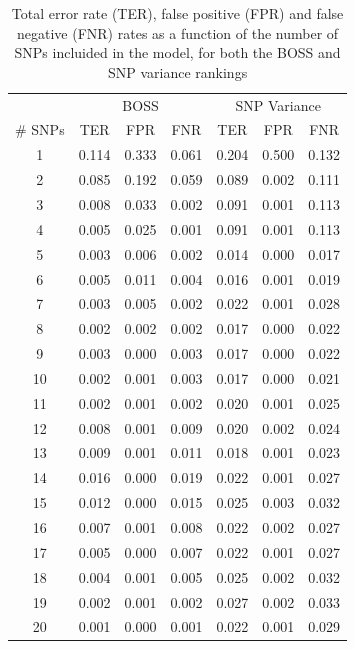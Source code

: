\begin{table}
\centering
\caption{Total error rate (TER), false positive (FPR) and false negative
  (FNR) rates as a function of the number of SNPs incluided in the
  model, for both the BOSS and SNP variance rankings}
\label{tab:error}       %
\begin{tabular}{ccccccc}
\hline\noalign{\smallskip}
 & \multicolumn{3}{c}{BOSS} & \multicolumn{3}{c}{SNP Variance}\\
\noalign{\smallskip}\hline\noalign{\smallskip}
\# SNPs & TER & FPR & FNR & TER & FPR & FNR\\
\noalign{\smallskip}\hline\noalign{\smallskip}
1 & 0.114 & 0.333 & 0.061 & 0.204 & 0.500 & 0.132\\
2 & 0.085 & 0.192 & 0.059 & 0.089 & 0.002 & 0.111\\
3 & 0.008 & 0.033 & 0.002 & 0.091 & 0.001 & 0.113\\
4 & 0.005 & 0.025 & 0.001 & 0.091 & 0.001 & 0.113\\
5 & 0.003 & 0.006 & 0.002 & 0.014 & 0.000 & 0.017\\
6 & 0.005 & 0.011 & 0.004 & 0.016 & 0.001 & 0.019\\
7 & 0.003 & 0.005 & 0.002 & 0.022 & 0.001 & 0.028\\
8 & 0.002 & 0.002 & 0.002 & 0.017 & 0.000 & 0.022\\
9 & 0.003 & 0.000 & 0.003 & 0.017 & 0.000 & 0.022\\
10 & 0.002 & 0.001 &  0.003 & 0.017 & 0.000 & 0.021\\
11 & 0.002 & 0.001 &  0.002 & 0.020 & 0.001 & 0.025\\
12 & 0.008 & 0.001 &  0.009 & 0.020 & 0.002 & 0.024\\
13 & 0.009 & 0.001 &  0.011 & 0.018 & 0.001 & 0.023\\
14 & 0.016 & 0.000 &  0.019 & 0.022 & 0.001 & 0.027\\
15 & 0.012 & 0.000 &  0.015 & 0.025 & 0.003 & 0.032\\
16 & 0.007 & 0.001 &  0.008 & 0.022 & 0.002 & 0.027\\
17 & 0.005 & 0.000 &  0.007 & 0.022 & 0.001 & 0.027\\
18 & 0.004 & 0.001 &  0.005 & 0.025 & 0.002 & 0.032\\
19 & 0.002 & 0.001 &  0.002 & 0.027 & 0.002 & 0.033\\
20 & 0.001 & 0.000 &  0.001 & 0.022 & 0.001 & 0.029\\

\end{tabular}
\end{table}

